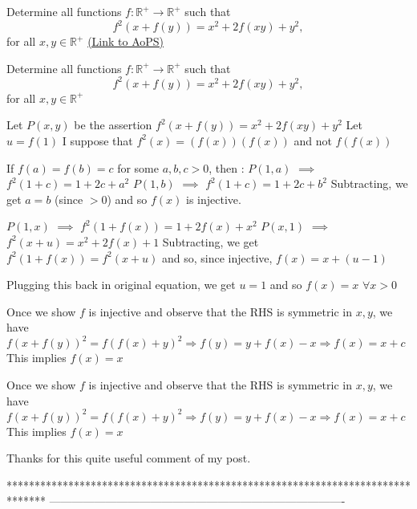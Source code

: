\begin{problem}
	Determine all functions $f : \mathbb{R}^+ \to \mathbb{R}^+$ such that \[ f^2(x+f(y))=x^2+2f(xy)+y^2 ,\]
for all $x,y \in \mathbb{R}^+$
	\flushright \href{https://artofproblemsolving.com/community/c6h610261}{(Link to AoPS)}
\end{problem}



\begin{solution}
	\begin{tcolorbox}Determine all functions $f : \mathbb{R}^+ \to \mathbb{R}^+$ such that \[ f^2(x+f(y))=x^2+2f(xy)+y^2 ,\]
for all $x,y \in \mathbb{R}^+$\end{tcolorbox}
Let $P(x,y)$ be the assertion $f^2(x+f(y))=x^2+2f(xy)+y^2$
Let $u=f(1)$
I suppose that $f^2(x)=(f(x))(f(x))$ and not $f(f(x))$

If $f(a)=f(b)=c$ for some $a,b,c>0$, then :
$P(1,a)$ $\implies$ $f^2(1+c)=1+2c+a^2$
$P(1,b)$ $\implies$ $f^2(1+c)=1+2c+b^2$
Subtracting, we get $a=b$ (since $>0$) and so $f(x)$ is injective.

$P(1,x)$ $\implies$ $f^2(1+f(x))=1+2f(x)+x^2$
$P(x,1)$ $\implies$ $f^2(x+u)=x^2+2f(x)+1$
Subtracting, we get $f^2(1+f(x))=f^2(x+u)$ and so, since injective, $f(x)=x+(u-1)$

Plugging this back in original equation, we get $u=1$ and so $\boxed{f(x)=x}$ $\forall x>0$
\end{solution}



\begin{solution}
	Once we show $f$ is injective and observe that the RHS is symmetric in $x,y$, we have
$f(x+f(y))^2 = f(f(x) + y)^2 \Rightarrow f(y) = y +f(x) - x \Rightarrow f(x) = x +c$
This implies $f(x) = x$
\end{solution}



\begin{solution}
	\begin{tcolorbox}Once we show $f$ is injective and observe that the RHS is symmetric in $x,y$, we have
$f(x+f(y))^2 = f(f(x) + y)^2 \Rightarrow f(y) = y +f(x) - x \Rightarrow f(x) = x +c$
This implies $f(x) = x$\end{tcolorbox}
Thanks for this quite useful comment of my post.
\end{solution}
*******************************************************************************
-------------------------------------------------------------------------------

